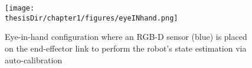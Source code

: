 \begin{figure}
  \centering
  \captionsetup{justification=centering}
  \texttt{[image: \\thesisDir/chapter1/figures/eyeINhand.png]}
  \caption{Eye-in-hand configuration where an RGB-D sensor 
  (blue) is placed on the end-effector link to perform the 
  robot's state estimation via auto-calibration 
  \parencite{Klingensmith2016}}
  \label{fig:eyeINhand}
\end{figure}

